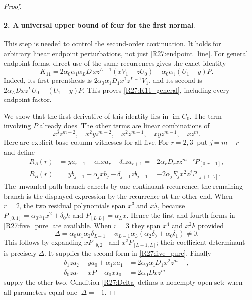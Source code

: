 \begin{proof}
\paragraph{2. A universal upper bound of four for the first normal.}
This step is needed to control the second-order continuation.
It holds for arbitrary linear endpoint perturbations, not just
\eqref{R27:endpoint_line}.
For general endpoint forms, direct use of the same recurrences
gives the exact identity
\begin{equation}\label{R27:K11_general}
 K_{11}=2\alpha_0\alpha_1\alpha_LD\,
       xz^{L-1}(xV_1-zU_0)
          -\alpha_0\alpha_1(U_1-y)P.
\end{equation}
Indeed, its first parenthesis is
$2\alpha_0\alpha_1D_1x^2z^{L-1}V_1$, and its second is
$2\alpha_LDxz^LU_0+(U_1-y)P$. This proves
\eqref{R27:K11_general}, including every endpoint factor.

We show that the first derivative of this identity lies in
$\operatorname{im}C_0$. The term involving $P$ already does.
The other terms are linear combinations of
\begin{equation}\label{R27:five_pure}
 x^3z^{m-2},\quad x^2yz^{m-2},\quad x^2z^{m-1},
 \quad xyz^{m-1},\quad xz^m.
\end{equation}
Here are explicit base-column witnesses for all five.
For $r=2,3$, put $j=m-r$ and define
\begin{align}
 R_A(r)&=ya_{r-1}-\alpha_rx a_r-\delta_rza_{r+1}
       =-2\alpha_rD_r xz^{m-r}P_{[0,r-1]},
                                                    \label{R27:RA}\\
 R_B(r)&=yb_{j+1}-\alpha_jxb_j-\delta_{j-1}zb_{j-1}
       =-2\alpha_jE_jx^2z^jP_{[j+1,L]}.
                                                    \label{R27:RB}
\end{align}
The unwanted path branch cancels by one continuant recurrence;
the remaining branch is the displayed expression by the recurrence
at the other end. When $r=2$, the two residual polynomials span
$x^3$ and $xh$, because
$P_{[0,1]}=\alpha_0\alpha_1x^2+\delta_0h$ and
$P_{[L,L]}=\alpha_Lx$. Hence the first and fourth forms in
\eqref{R27:five_pure} are available. When $r=3$ they span
$x^4$ and $x^2h$ provided
\begin{equation}\label{R27:Delta}
 \Delta=\alpha_0\alpha_1\alpha_2\delta_{L-1}
       -\alpha_{L-1}\alpha_L(\alpha_2\delta_0+\alpha_0\delta_1)
       \ne0.
\end{equation}
This follows by expanding $xP_{[0,2]}$ and
$x^2P_{[L-1,L]}$; their coefficient determinant is precisely
$\Delta$. It supplies the second form in \eqref{R27:five_pure}.
Finally
\begin{align*}
 \delta_1za_2-ya_0+\alpha_1xa_1
       &=2\alpha_0\alpha_1D_1x^2z^{m-1},\\
 \delta_0za_1-xP+\alpha_0xa_0
       &=2\alpha_0D xz^m
\end{align*}
supply the other two. Condition \eqref{R27:Delta} defines a
nonempty open set: when all parameters equal one, $\Delta=-1$.


\end{proof}
